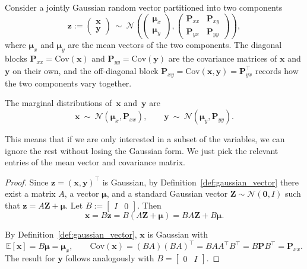 Consider a jointly Gaussian random vector partitioned into two components
\[
\mathbf{z} :=
\begin{pmatrix}
\mathbf{x} \\
\mathbf{y}
\end{pmatrix}
\:\sim\:
\mathcal{N}
\left(
\begin{pmatrix}
\boldsymbol{\mu}_x \\
\boldsymbol{\mu}_y
\end{pmatrix},
\begin{pmatrix}
\mathbf{P}_{xx} & \mathbf{P}_{xy} \\
\mathbf{P}_{yx} & \mathbf{P}_{yy}
\end{pmatrix}
\right),
\]
where $\boldsymbol{\mu}_x$ and $\boldsymbol{\mu}_y$ are the mean vectors of the two components. The diagonal blocks $\mathbf{P}_{xx} = \mathrm{Cov}(\mathbf{x})$ and $\mathbf{P}_{yy} = \mathrm{Cov}(\mathbf{y})$ are the covariance matrices of $\mathbf{x}$ and $\mathbf{y}$ on their own, and the off-diagonal block $\mathbf{P}_{xy} = \mathrm{Cov}(\mathbf{x}, \mathbf{y}) = \mathbf{P}_{yx}^\top$ records how the two components vary together.

\begin{proposition}\label{prop:marginal}
The marginal distributions of\, $\mathbf{x}$ and\, $\mathbf{y}$ are
\[
\mathbf{x}
\:\sim\:
\mathcal{N}(\boldsymbol{\mu}_x,\mathbf{P}_{xx}),\qquad
\mathbf{y}
\:\sim\:
\mathcal{N}(\boldsymbol{\mu}_y,\mathbf{P}_{yy}).
\]
\end{proposition}
This means that if we are only interested in a subset of the variables, we can ignore the rest without losing the Gaussian form. We just pick the relevant entries of the mean vector and covariance matrix. 
\begin{proof}
Since $\mathbf{z} = (\mathbf{x}, \mathbf{y})^\top$
is Gaussian, by Definition~\ref{def:gaussian_vector} there exist a matrix $A$, a vector $\boldsymbol{\mu}$, and a standard Gaussian vector $\mathbf{Z} \sim \mathcal{N}(\mathbf{0}, I)$ such that $\mathbf{z} = A\mathbf{Z} + \boldsymbol{\mu}$.
Let $B := \begin{bmatrix}I & 0\end{bmatrix}$. Then
\[
\mathbf{x} = B\mathbf{z} 
= B(A\mathbf{Z}+\boldsymbol{\mu})
= BA\mathbf{Z}+B\boldsymbol{\mu}.
\]

By Definition~\ref{def:gaussian_vector}, $\mathbf{x}$ is Gaussian with
\[
  \mathbb{E}[\mathbf{x}] = B\boldsymbol{\mu} = \boldsymbol{\mu}_x, \qquad
  \mathrm{Cov}(\mathbf{x}) = (BA)(BA)^\top = BAA^\top B^\top = B\mathbf{P}B^\top = \mathbf{P}_{xx}.
\]
The result for $\mathbf{y}$ follows analogously with $B = \begin{bmatrix}0 & I\end{bmatrix}$.
\end{proof}


